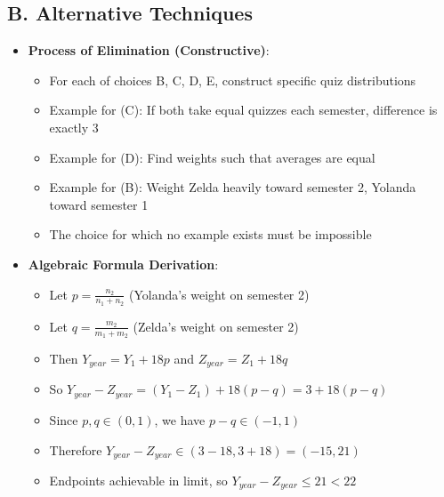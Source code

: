 \documentclass[12pt]{article}
\begin{document}
\begin{techniquesbox}
\subsection*{B. Alternative Techniques}
\begin{itemize}[leftmargin=*]
    \item \textbf{Process of Elimination (Constructive)}:
    \begin{itemize}
        \item For each of choices B, C, D, E, construct specific quiz distributions
        \item Example for (C): If both take equal quizzes each semester, difference is exactly 3
        \item Example for (D): Find weights such that averages are equal
        \item Example for (B): Weight Zelda heavily toward semester 2, Yolanda toward semester 1
        \item The choice for which no example exists must be impossible
    \end{itemize}
    \item \textbf{Algebraic Formula Derivation}:
    \begin{itemize}
        \item Let $p = \frac{n_2}{n_1 + n_2}$ (Yolanda's weight on semester 2)
        \item Let $q = \frac{m_2}{m_1 + m_2}$ (Zelda's weight on semester 2)
        \item Then $Y_{year} = Y_1 + 18p$ and $Z_{year} = Z_1 + 18q$
        \item So $Y_{year} - Z_{year} = (Y_1 - Z_1) + 18(p - q) = 3 + 18(p - q)$
        \item Since $p, q \in (0, 1)$, we have $p - q \in (-1, 1)$
        \item Therefore $Y_{year} - Z_{year} \in (3 - 18, 3 + 18) = (-15, 21)$
        \item Endpoints achievable in limit, so $Y_{year} - Z_{year} \leq 21 < 22$
    \end{itemize}
\end{itemize}


\end{techniquesbox}
\end{document}
